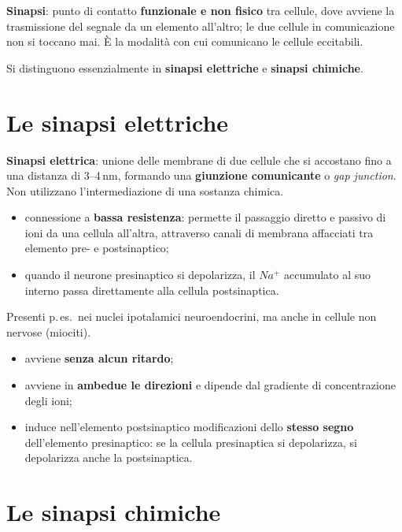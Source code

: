 \textbf{Sinapsi}: punto di contatto \textbf{funzionale e non fisico} tra cellule, dove avviene la
trasmissione del segnale da un elemento all'altro; le due cellule in comunicazione non si toccano
mai. È la modalità con cui comunicano le cellule eccitabili.

Si distinguono essenzialmente in \textbf{sinapsi elettriche} e \textbf{sinapsi chimiche}.

\section{Le sinapsi elettriche}

\textbf{Sinapsi elettrica}: unione delle membrane di due cellule che si accostano fino a una
distanza di 3--4\,nm, formando una \textbf{giunzione comunicante} o \textit{gap junction}. Non
utilizzano l'intermediazione di una sostanza chimica.
\begin{itemize}
  \item connessione a \textbf{bassa resistenza}: permette il passaggio diretto e passivo di ioni da
    una cellula all'altra, attraverso canali di membrana affacciati tra elemento pre- e
    postsinaptico;
  \item quando il neurone presinaptico si depolarizza, il $Na^+$ accumulato al suo interno passa
    direttamente alla cellula postsinaptica.
\end{itemize}

Presenti p.\,es.\ nei nuclei ipotalamici neuroendocrini, ma anche in cellule non nervose (miociti).

\begin{itemize}
  \item avviene \textbf{senza alcun ritardo};
  \item avviene in \textbf{ambedue le direzioni} e dipende dal gradiente di concentrazione degli
    ioni;
  \item induce nell'elemento postsinaptico modificazioni dello \textbf{stesso segno} dell'elemento
    presinaptico: se la cellula presinaptica si depolarizza, si depolarizza anche la postsinaptica.
\end{itemize}

\section{Le sinapsi chimiche}

